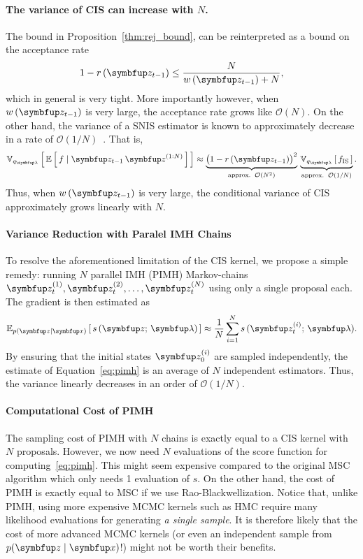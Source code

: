 \paragraph{The variance of CIS can increase with \(N\).}
The bound in Proposition~\ref{thm:rej_bound}, can be reinterpreted as a bound on the acceptance rate 
\begin{align}
  1 - r\,(\vz_{t-1}) \leq \frac{N}{ w\,(\vz_{t-1}) + N},
\end{align}
which in general is very tight.
More importantly however, when \(w\,(\vz_{t-1})\) is very large, the acceptance rate grows like \(\mathcal{O}(N)\).
On the other hand, the variance of a SNIS estimator is known to approximately decrease in a rate of \(\mathcal{O}(1/N)\)~\citep{kong_sequential_1994, robert_monte_2004, elvira_rethinking_2018}.
That is, 
\begin{align}
  \Vsub{q_{\vlambda}}{ \E{ f \mid \vz_{t-1}\,\vz^{(1:N)} } } \approx \underbrace{{\big(1 - r\,(\vz_{t-1})\big)}^2}_{\text{approx.}\;\;\mathcal{O}(N^2)} \,
  \underbrace{\Vsub{q_{\vlambda}}{ f_{\text{IS}} }}_{\text{approx.}\;\;\mathcal{O}(1/N)}.
\end{align}
Thus, when \(w\,(\vz_{t-1})\) is very large, the conditional variance of CIS approximately grows linearly with \(N\).

\paragraph{Variance Reduction with Paralel IMH Chains}
To resolve the aforementioned limitation of the CIS kernel, we propose a simple remedy: running \(N\) parallel IMH (PIMH) Markov-chains \(\vz_t^{(1)}, \vz_t^{(2)}, \ldots, \vz_t^{(N)}\) using only a single proposal each.
The gradient is then estimated as
\begin{align}
  \Esub{p(\vz\mid\vx)}{ s\,(\vz;\,\vlambda) } \approx \frac{1}{N} \sum_{i=1}^N s\,(\vz_t^{(i)};\,\vlambda).\label{eq:pimh}
\end{align}
By ensuring that the initial states \(\vz_{0}^{(i)}\) are sampled independently, the estimate of Equation~\eqref{eq:pimh} is an average of \(N\) independent estimators.
Thus, the variance linearly decreases in an order of \(\mathcal{O}(1/N)\).

\paragraph{Computational Cost of PIMH}
The sampling cost of PIMH with \(N\) chains is exactly equal to a CIS kernel with \(N\) proposals.
However, we now need \(N\) evaluations of the score function for computing~\eqref{eq:pimh}.
This might seem expensive compared to the original MSC algorithm which only needs 1 evaluation of \(s\).
On the other hand, the cost of PIMH is exactly equal to MSC if we use Rao-Blackwellization.
Notice that, unlike PIMH, using more expensive MCMC kernels such as HMC require many likelihood evaluations for generating \textit{a single sample}.
It is therefore likely that the cost of more advanced MCMC kernels (or even an independent sample from \(p(\vz\mid\vx)\)!) might not be worth their benefits.


